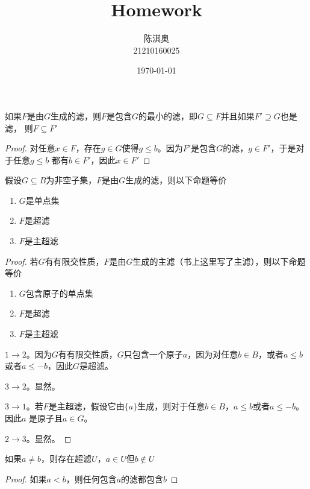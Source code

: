 \documentclass[11pt]{article}
\author{陈淇奥\\21210160025}
\date{\today}
\title{Homework}
\begin{document}
\maketitle
\begin{exercise}[3.2.13]
如果\(F\)是由\(G\)生成的滤，则\(F\)是包含\(G\)的最小的滤，即\(G\subseteq F\)并且如果\(F'\supseteq G\)也是滤，
则\(F\subseteq F'\)
\end{exercise}

\begin{proof}
对任意\(x\in F\)，存在\(g\in G\)使得\(g\le b\)。因为\(F'\)是包含\(G\)的滤，\(g\in F'\)，于是对于任意\(g\le b\)
都有\(b\in F'\)，因此\(x\in F'\)
\end{proof}

\begin{exercise}[3.2.16]
假设\(G\subseteq B\)为非空子集，\(F\)是由\(G\)生成的滤，则以下命题等价
\begin{enumerate}
\item \(G\)是单点集
\item \(F\)是超滤
\item \(F\)是主超滤
\end{enumerate}
\end{exercise}

\begin{proof}
若\(G\)有有限交性质，\(F\)是由\(G\)生成的主滤（书上这里写了主滤），则以下命题等价
\begin{enumerate}
\item \(G\)包含原子的单点集
\item \(F\)是超滤
\item \(F\)是主超滤
\end{enumerate}



\(1\to 2\)。因为\(G\)有有限交性质，\(G\)只包含一个原子\(a\)，因为对任意\(b\in B\)，或者\(a\le b\)或者\(a\le -b\)，因此\(G\)是超滤。

\(3\to 2\)。显然。

\(3\to 1\)。若\(F\)是主超滤，假设它由\(\{a\}\)生成，则对于任意\(b\in B\)，\(a\le b\)或者\(a\le -b\)。因此\(a\)
是原子且\(a\in G\)。

\(2\to 3\)。显然。
\end{proof}

\begin{exercise}[3.2.18]
如果\(a\neq b\)，则存在超滤\(U\)，\(a\in U\)但\(b\notin U\)
\end{exercise}

\begin{proof}
如果\(a<b\)，则任何包含\(a\)的滤都包含\(b\)
\end{proof}
\end{document}
